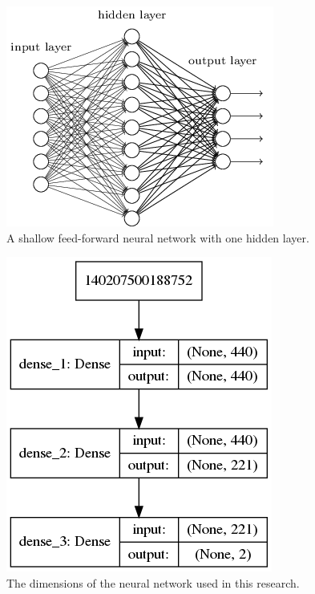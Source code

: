 \documentclass{report}
\begin{document}
\begin{figure}[h]
    \centering
    \includegraphics[scale=0.6]{figures/shallow_neural_network.png}
    \caption[]{A shallow feed-forward neural network with one hidden layer.}
    \label{fig:shallow_neural_network}
\end{figure}

\begin{figure}[h]
    \centering
    \includegraphics[scale=0.5]{figures/neural_network_model.png}
    \caption[]{The dimensions of the neural network used in this research.}
    \label{fig:neural_network_model}
\end{figure}

% 
% 
\end{document}
